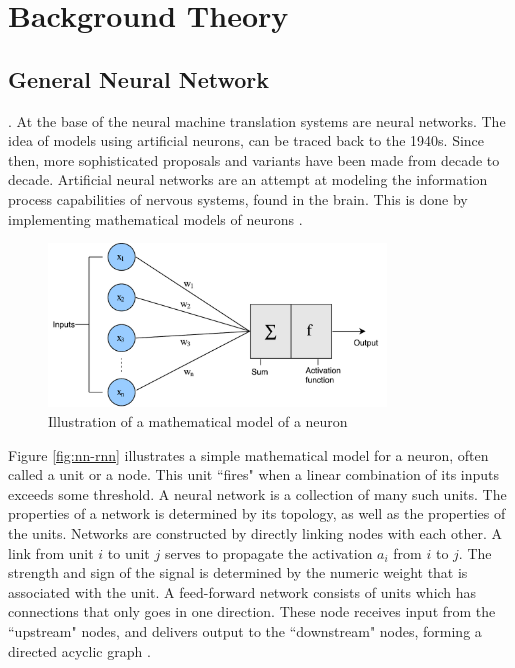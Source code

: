
\chapter{Background Theory}
\label{ch:background}


\section{General Neural Network}
. At the base of the neural machine translation systems are neural networks. The idea of models using artificial neurons, can be traced back to the 1940s. Since then, more sophisticated proposals and variants have been made from decade to decade. Artificial neural networks are an attempt at modeling the information process capabilities of nervous systems, found in the brain. This is done by implementing mathematical models of neurons \citep{russell2010aimodernapproach}.

\begin{figure}[ht]
    \centering
    \includegraphics[width=0.8\textwidth]{fig/related_work/nn_perceptron.pdf}
    \caption{Illustration of a mathematical model of a neuron}
    \label{fig:nn-perceptron}
\end{figure}

Figure \ref{fig:nn-rnn} illustrates a simple mathematical model for a neuron, often called a unit or a node. This unit ``fires" when a linear combination of its inputs exceeds some threshold. A neural network is a collection of many such units. The properties of a network is determined by its topology, as well as the properties of the units. Networks are constructed by directly linking nodes with each other. A link from unit \(i\) to unit \(j\) serves to propagate the activation \(a_{i}\) from \(i\) to \(j\). The strength and sign of the signal is determined by the numeric weight that is associated with the unit. A feed-forward network consists of units which has connections that only goes in one direction. These node receives input from the ``upstream" nodes, and delivers output to the ``downstream" nodes, forming a directed acyclic graph \citep{russell2010aimodernapproach}.

